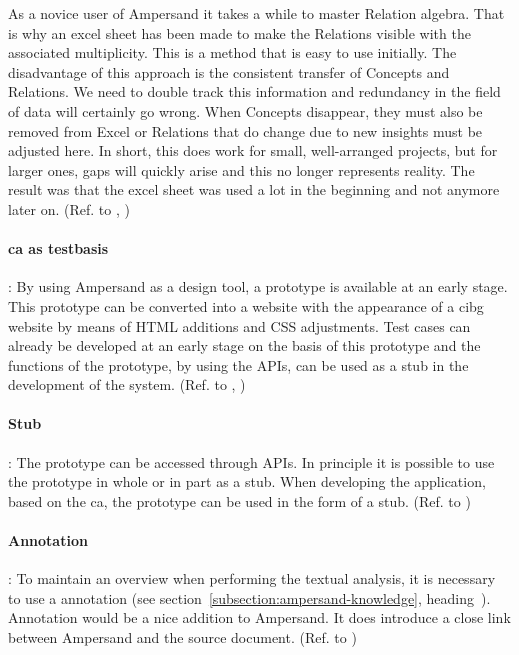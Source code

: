 As a novice user of Ampersand it takes a while to master Relation algebra.
That is why an excel sheet has been made to make the Relations visible with the associated multiplicity.
This is a method that is easy to use initially.
The disadvantage of this approach is the consistent transfer of Concepts and Relations.
We need to double track this information and redundancy in the field of data will certainly go wrong.
When Concepts disappear, they must also be removed from Excel or Relations that do change due to new insights must be adjusted here.
In short, this does work for small, well-arranged projects, but for larger ones, gaps will quickly arise and this no longer represents reality.
The result was that the excel sheet was used a lot in the beginning and not anymore later on.
(Ref. to , )

\paragraph{\textbf{\acrlong{ca} as testbasis}}\label{swot:o_ca_as_testbasis}:
By using Ampersand as a design tool, a prototype is available at an early stage.
This prototype can be converted into a website with the appearance of a \acrshort{cibg} website by means of HTML additions and CSS adjustments.
Test cases can already be developed at an early stage on the basis of this prototype and the functions of the prototype, by using the APIs, can be used as a stub in the development of the system.
(Ref. to , )

\paragraph{\textbf{Stub}}\label{swot:o_stub}:
The prototype can be accessed through APIs.
In principle it is possible to use the prototype in whole or in part as a stub.
When developing the application, based on the \acrshort{ca}, the prototype can be used in the form of a stub.
(Ref. to )


\paragraph{\textbf{Annotation}}\label{swot:o_annotation}:
To maintain an overview when performing the textual analysis, it is necessary to use a annotation (see section~\ref{subsection:ampersand-knowledge}, heading~).
Annotation would be a nice addition to Ampersand.
It does introduce a close link between Ampersand and the source document.
(Ref. to )